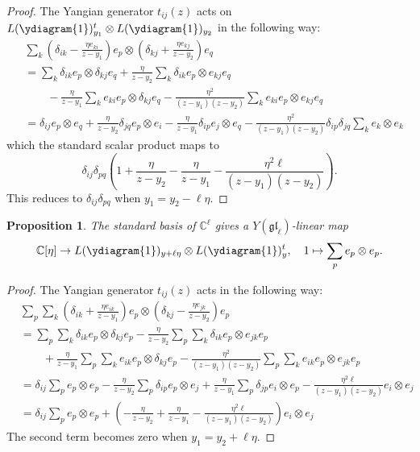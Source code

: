 \documentclass[11pt]{report}
\newtheorem{prop}[theorem]{Proposition}
\theoremstyle{definition}
\theoremstyle{remark}
\theoremstyle{remark}
\newcommand{\C}{\mathbb{C}}
\begin{document}
\begin{proof}
The Yangian generator $t_{ij}(z)$ acts on $L(\ydiagram{1})_{y_1}^t \otimes L(\ydiagram{1})_{y_2}$ in the following way:
\begin{align*}
&\sum_k \left( \delta_{ik}-\frac{\eta e_{ki}}{z-y_1} \right) e_p \otimes \left( \delta_{kj}+\frac{\eta e_{kj}}{z-y_2} \right) e_q \\
&= \sum_k \delta_{ik} e_p \otimes \delta_{kj} e_q + \frac{\eta}{z-y_2} \sum_k \delta_{ik} e_p \otimes e_{kj} e_q \\
& \quad \quad - \frac{\eta}{z-y_1} \sum_k e_{ki} e_p \otimes \delta_{kj} e_q
- \frac{\eta^2}{(z-y_1)(z-y_2)} \sum_k e_{ki} e_p \otimes e_{kj} e_q \\
&= \delta_{ij} e_p \otimes e_q
+ \frac{\eta}{z-y_2} \delta_{jq} e_p \otimes e_i
- \frac{\eta}{z-y_1} \delta_{ip} e_j \otimes e_q
- \frac{\eta^2}{(z-y_1)(z-y_2)} \delta_{ip} \delta_{jq} \sum_k e_k \otimes e_k
\end{align*}
which the standard scalar product maps to
\begin{equation*}
\delta_{ij} \delta_{pq} \left( 1
+ \frac{\eta}{z-y_2}
- \frac{\eta}{z-y_1}
- \frac{\eta^2 \ell}{(z-y_1)(z-y_2)} \right).
\end{equation*}
This reduces to $\delta_{ij} \delta_{pq}$ when $y_1 = y_2-\ell \eta$.
\end{proof}

\begin{prop}
The standard basis of $\C^\ell$ gives a $Y(\mathfrak{gl}_\ell)$-linear map
\begin{equation*}
\C[\eta] \to L(\ydiagram{1})_{y+\ell \eta} \otimes L(\ydiagram{1})_y^t, \quad 1 \mapsto \sum_p e_p \otimes e_p.
\end{equation*}
\end{prop}

\begin{proof}
The Yangian generator $t_{ij}(z)$ acts in the following way:
\begin{align*}
&\sum_p \sum_k \left( \delta_{ik}+\frac{\eta e_{ik}}{z-y_1} \right) e_p \otimes \left( \delta_{kj}-\frac{\eta e_{jk}}{z-y_2} \right) e_p \\
&= \sum_p \sum_k \delta_{ik} e_p \otimes \delta_{kj} e_p - \frac{\eta}{z-y_2} \sum_p \sum_k \delta_{ik} e_p \otimes e_{jk} e_p \\
& \quad \quad + \frac{\eta}{z-y_1} \sum_p \sum_k e_{ik} e_p \otimes \delta_{kj} e_p
- \frac{\eta^2}{(z-y_1)(z-y_2)} \sum_p \sum_k e_{ik} e_p \otimes e_{jk} e_p \\
&= \delta_{ij} \sum_p e_p \otimes e_p
- \frac{\eta}{z-y_2} \sum_p \delta_{ip} e_p\otimes e_j
+ \frac{\eta}{z-y_1} \sum_p \delta_{jp} e_i \otimes e_p
- \frac{\eta^2 \ell}{(z-y_1)(z-y_2)} e_i \otimes e_j \\
&= \delta_{ij} \sum_p e_p \otimes e_p
+ \left(- \frac{\eta}{z-y_2}
+ \frac{\eta}{z-y_1}
- \frac{\eta^2 \ell}{(z-y_1)(z-y_2)} \right) e_i \otimes e_j
\end{align*}
The second term becomes zero when $y_1 = y_2 + \ell \eta$.
\end{proof}
\end{document}
